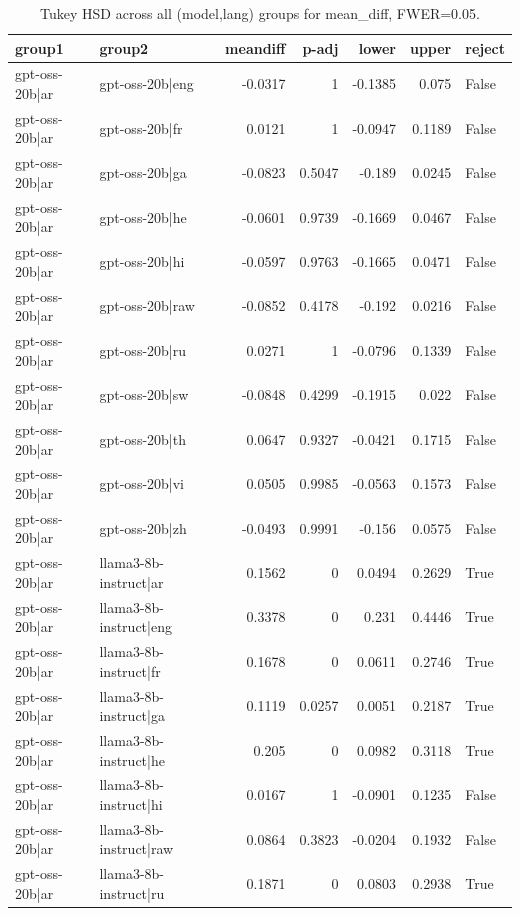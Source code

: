 \begin{table}
\caption{Tukey HSD across all (model,lang) groups for mean_diff, FWER=0.05.}
\label{tab:tukey_all_models_all_langs_mean_diff}
\begin{tabular}{l l r r r r l}
\toprule
group1 & group2 & meandiff & p-adj & lower & upper & reject \\
\midrule
gpt-oss-20b|ar & gpt-oss-20b|eng & -0.0317 & 1 & -0.1385 & 0.075 & False \\
gpt-oss-20b|ar & gpt-oss-20b|fr & 0.0121 & 1 & -0.0947 & 0.1189 & False \\
gpt-oss-20b|ar & gpt-oss-20b|ga & -0.0823 & 0.5047 & -0.189 & 0.0245 & False \\
gpt-oss-20b|ar & gpt-oss-20b|he & -0.0601 & 0.9739 & -0.1669 & 0.0467 & False \\
gpt-oss-20b|ar & gpt-oss-20b|hi & -0.0597 & 0.9763 & -0.1665 & 0.0471 & False \\
gpt-oss-20b|ar & gpt-oss-20b|raw & -0.0852 & 0.4178 & -0.192 & 0.0216 & False \\
gpt-oss-20b|ar & gpt-oss-20b|ru & 0.0271 & 1 & -0.0796 & 0.1339 & False \\
gpt-oss-20b|ar & gpt-oss-20b|sw & -0.0848 & 0.4299 & -0.1915 & 0.022 & False \\
gpt-oss-20b|ar & gpt-oss-20b|th & 0.0647 & 0.9327 & -0.0421 & 0.1715 & False \\
gpt-oss-20b|ar & gpt-oss-20b|vi & 0.0505 & 0.9985 & -0.0563 & 0.1573 & False \\
gpt-oss-20b|ar & gpt-oss-20b|zh & -0.0493 & 0.9991 & -0.156 & 0.0575 & False \\
gpt-oss-20b|ar & llama3-8b-instruct|ar & 0.1562 & 0 & 0.0494 & 0.2629 & True \\
gpt-oss-20b|ar & llama3-8b-instruct|eng & 0.3378 & 0 & 0.231 & 0.4446 & True \\
gpt-oss-20b|ar & llama3-8b-instruct|fr & 0.1678 & 0 & 0.0611 & 0.2746 & True \\
gpt-oss-20b|ar & llama3-8b-instruct|ga & 0.1119 & 0.0257 & 0.0051 & 0.2187 & True \\
gpt-oss-20b|ar & llama3-8b-instruct|he & 0.205 & 0 & 0.0982 & 0.3118 & True \\
gpt-oss-20b|ar & llama3-8b-instruct|hi & 0.0167 & 1 & -0.0901 & 0.1235 & False \\
gpt-oss-20b|ar & llama3-8b-instruct|raw & 0.0864 & 0.3823 & -0.0204 & 0.1932 & False \\
gpt-oss-20b|ar & llama3-8b-instruct|ru & 0.1871 & 0 & 0.0803 & 0.2938 & True \\

\end{tabular}
\end{table}
